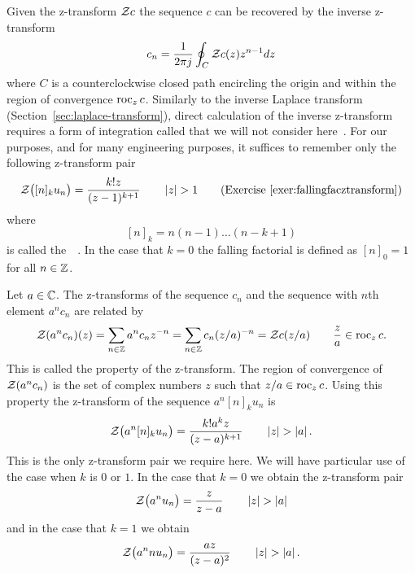 \newcommand{\stirling}[2]{\genfrac{[}{]}{0pt}{}{#1}{#2}}
\newcommand{\eulerian}[2]{\genfrac{\langle}{\rangle}{0pt}{}{#1}{#2}}

Given the z-transform ${\mathcal Z} c$ the sequence $c$ can be recovered by the inverse z-transform
\[
c_n = \frac{1}{2\pi j} \oint_C {\mathcal Z} c(z) z^{n-1} dz
\]
where $C$ is a counterclockwise closed path encircling the origin and within the region of convergence $\operatorname{roc}_z c$.  Similarly to the inverse Laplace transform (Section~\ref{sec:laplace-transform}), direct calculation of the inverse z-transform requires a form of integration called  that we will not consider here~\citep{Stewart_ComplexAnalysis_2004}.  For our purposes, and for many engineering purposes, it suffices to remember only the following z-transform pair 
\[
{\mathcal Z}\big( [n]_k u_n \big) = \frac{k! z }{(z - 1)^{k+1}} \qquad \left\vert z \right\vert > 1 \qquad \text{(Exercise~\ref{exer:fallingfacztransform})}
\]
where
\[
[n]_k = n (n-1) \dots (n-k+1)
\]
is called the~~\cite[p. 48]{concretemath_1994}.  In the case that $k=0$ the falling factorial is defined as $[n]_0 = 1$ for all $n\in{\mathbb Z}$.  

Let $a \in {\mathbb C}$.  The z-transforms of the sequence $c_n$ and the sequence with $n$th element $a^nc_n$ are related by 
\[
{\mathcal Z}(a^n c_n)(z) = \sum_{n \in {\mathbb Z}} a^n c_n z^{-n} = \sum_{n \in {\mathbb Z}} c_n (z/a)^{-n} = {\mathcal Z} c(z/a) \qquad \frac{z}{a} \in \operatorname{roc}_z c.
\]
This is called the  property of the z-transform.  The region of convergence of ${\mathcal Z}(a^n c_n)$ is the set of complex numbers $z$ such that $z/a \in \operatorname{roc}_z c$.  Using this property the z-transform of the sequence $a^n [n]_k u_n$ is
\begin{equation}\label{eeq:onlyztrans}
{\mathcal Z}\big( a^n [n]_k u_n \big) = \frac{k! a^k z }{(z - a)^{k+1}} \qquad \left\vert z \right\vert > \left\vert a \right\vert.
\end{equation}
This is the only z-transform pair we require here.  We will have particular use of the case when $k$ is $0$ or $1$.  In the case that $k=0$ we obtain the z-transform pair
\[
{\mathcal Z}\big( a^n u_n \big) = \frac{ z }{z - a} \qquad \left\vert z \right\vert > \left\vert a \right\vert
\]
and in the case that $k=1$ we obtain
\[
{\mathcal Z}\big( a^n n u_n \big) = \frac{ a z }{(z - a)^{2}} \qquad \left\vert z \right\vert > \left\vert a \right\vert.
\]

